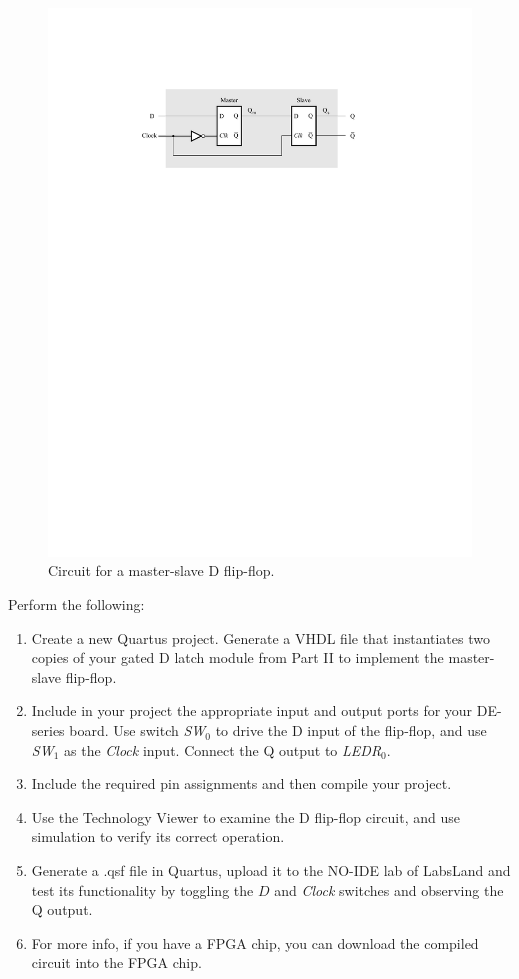 \documentclass[epsfig,10pt,fullpage]{article}
\begin{document}
\begin{figure}[H]
	\begin{center}
		\includegraphics[]{figures/figure5.pdf}
	\end{center}
	\caption{Circuit for a master-slave D flip-flop.}
\label{fig:MS_FF}
\end{figure}

Perform the following:
\begin{enumerate}
\item Create a new Quartus project. Generate a VHDL file that instantiates two
copies of your gated D latch module from Part II to implement the master-slave flip-flop.
\item Include in your project the appropriate input and output ports for your 
DE-series board. Use switch {\it SW}$_0$ to drive the D input of the flip-flop,
and use {\it SW}$_1$ as the {\it Clock} input. Connect the Q output to {\it LEDR}$_{0}$.
\item
Include the required pin assignments and then compile your project.
\item Use the Technology Viewer to examine the D flip-flop circuit, and use
simulation to verify its correct operation.
\item
Generate a .qsf file in Quartus, upload it to the NO-IDE lab of LabsLand and test its functionality 
by toggling the $D$ and {\it Clock} switches and observing the Q output.
\item For more info, if you have a FPGA chip, you can download the compiled circuit into the FPGA chip.
\end{enumerate}
\end{document}

